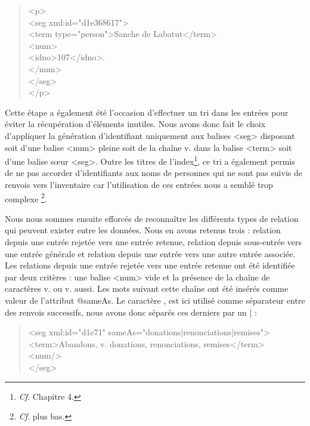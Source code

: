 \documentclass[a4paper,12pt,twoside]{book}
\begin{document}
	\begin{quotation}
		<p>\\
		\indent\indent<seg xml:id="d1e368617">\\
		\indent\indent\indent<term type="person">Sanche de Labatut</term>\\
		\indent\indent\indent<num>\\
		\indent\indent\indent{}107</idno>.\\
		\indent\indent{}\\
		\indent{}\\
		\indent</p>
	\end{quotation}
	
	\noindent Cette étape a également été l'occasion d'effectuer un tri dans les entrées pour éviter la récupération d'éléments inutiles. Nous avons donc fait le choix d'appliquer la génération d'identifiant uniquement aux balises <seg> disposant soit d'une balise <num> pleine soit de la chaîne \og v.\fg{} dans la balise <term> soit d'une balise sœur <seg>. Outre les titres de l'index\footnote{\textit{Cf}. Chapitre 4.}, ce tri a également permis de ne pas accorder d'identifiants aux noms de personnes qui ne sont pas suivis de renvois vers l'inventaire car l'utilisation de ces entrées nous a semblé trop complexe \footnote{\textit{Cf}. plus bas.}.
	
	Nous nous sommes ensuite efforcés de reconnaître les différents types de relation qui peuvent exister entre les données. Nous en avons retenus trois : relation depuis une entrée rejetée vers une entrée retenue, relation depuis sous-entrée vers une entrée générale et relation depuis une entrée vers une autre entrée associée. Les relations depuis une entrée rejetée vers une entrée retenue ont été identifiée par deux critères : une balise <num> vide et la présence de la chaîne de caractères \og v.\fg{} ou \og v. aussi\fg{}. Les mots suivant cette chaîne ont été insérés comme valeur de l'attribut @sameAs. Le caractère \og ,\fg{} est ici utilisé comme séparateur entre des renvois successifs, nous avons donc séparés ces derniers par un \og |\fg{} :
	
	\begin{quotation}
               <seg xml:id="d1e71" sameAs="donations|renonciations|remises">\\
				\indent\indent<term>Abandons, v. donations, renonciations, remises</term>\\
				\indent\indent<num/>\\
				\indent</seg>
	\end{quotation}
\end{document}
